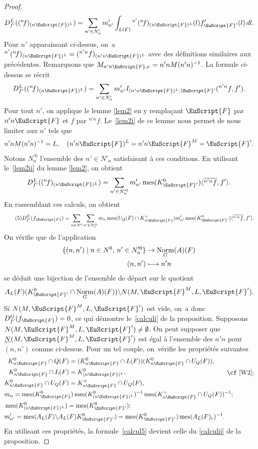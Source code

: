 \documentclass[JEP,XML,SOM,Unicode,francais]{cedram}
\let\mathcal \EuScript
\let\<\langle
\let\>\rangle
\let\sep\mid
\newcommand\mto{\mathchoice{\longmapsto}{\mapsto}{\mapsto}{\mapsto}}
\newcommand{\nf}{{}^n\!f}
\newcommand{\rc}{\mathrm{c}}
\DeclareMathOperator{\mes}{mes}
\DeclareMathOperator{\Norm}{Norm}
\newcommand{\cF}{\mathcal{F}}
\theoremstyle{plain}
\theoremstyle{definition}
\begin{document}
\begin{proof}
\[
D_{f'}^L((\nf)_{(n\cF)^L})=\sum_{n'\in N'_{n}}m'_{n'}\int_{L(F)}{^{n'}(\nf)_{(n\cF)^L}}(l)f'_{\cF'}(l)\,dl.
\]
Pour $n'$ apparaissant ci-dessus, on~a $^{n'}(\nf)_{(n\cF)^L}=(^{n'n}f)_{(n'n\cF)^L}$ avec des définitions similaires aux précédentes. Remarquons que $M_{n'n\cF,\nu}=n'nM(n'n)^{-1}$. La formule ci-dessus se récrit
\[
D_{f'}^L((\nf)_{(n\cF)^L})=\sum_{n'\in N'_{n}}m'_{n'}I_{(n'n\cF)^L,\cF'}(^{n'n}f,f').
\]
Pour tout $n'$, on applique le lemme \ref{lem2} en y remplaçant $\cF$ par $n'n\cF$ et $f$ par $^{n'n}f$. Le~\eqref{lem2i} de ce lemme nous permet de nous limiter aux $n'$ tels que
\[
n'nM(n'n)^{-1}=L,\quad (n'n\cF)^L=n'n\cF^M=\cF'.
\]
Notons $N_{n}^{\prime0}$ l'ensemble des $n'\in N'_{n}$ satisfaisant à ces conditions. En utilisant le~\eqref{lem2ii} du lemme \ref{lem2}, on obtient
\[
D_{f'}^L((\nf)_{(n\cF)^L})=\sum_{n'\in N^{\prime0}_{n}}m'_{n'}\mes(K_{\cF'}^0)\<\overline{^{n'n}f},f'\>.
\]
En rassemblant ces calculs, on obtient
\begin{equation}\tag{5}\label{calcul5}
D^G_{f'}(f_{\cF})= \sum_{n\in N^0}\sum_{n'\in N_{n}^{\prime0}}m_{n}\mes(U_{Q}(F)\cap K_{n\cF}^+) m'_{n'}\mes(K_{\cF'}^0)\<\overline{^{n'n}f},f'\>.
\end{equation}
On vérifie que de l'application
\begin{align*}
\{(n,n')\sep n\in N^0,\, n'\in N_{n}^{\prime0}\}&\to \Norm_{G}(A)(F)\\ (n,n')&\mto n'n
\end{align*}
se déduit une bijection de l'ensemble de départ sur le quotient
\[
A_{L}(F)(K_{\cF'}^0\cap \Norm_{G}(A)(F))\backslash N(M,\cF^{M},L,\cF') .
\]
Si $N(M,\cF^{M},L,\cF')$ est vide, on~a donc $D^G_{f'}(f_{\cF})=0$, ce qui démontre le~\eqref{calculi} de la proposition. Supposons $N(M,\cF^M,L,\cF')\neq\emptyset$. On peut supposer que $\underline{N}(M,\cF^M,L,\cF')$ est égal à l'ensemble des $n'n$ pour $(n,n')$ comme ci-dessus.
Pour un tel couple, on~vérifie les propriétés suivantes
\begin{align*}
&
\begin{aligned}
K_{n\cF}^0\cap Q(F)&=(K_{n\cF}^0\cap L(F))(K_{n\cF}^0\cap U_{Q}(F)),\\
K_{n\cF}^0\cap L(F)&=K_{(n\cF)^L}^0,\\
K_{n\cF}^0\cap U_{Q}(F)&=K_{n\cF}^+\cap U_{Q}(F),
\end{aligned}
\qquad\text{\cf \cite[Lem.\,6]{W2};}
\\
&m_{n}=\mes(K_{\cF}^0)\mes(K_{(n\cF)^L}^0)^{-1}\mes(K_{n\cF}^+\cap U_{Q}(F))^{-1};
\\
&\mes(K_{(n\cF)^L}^0)=\mes(K_{\cF'}^0);
\\
&m'_{n'}=\mes(A_{L}(F)\backslash A_{L}(F)K_{\cF'}^0)=\mes(K_{\cF'}^0)\mes(A_{L}(F)_{\rc})^{-1}.
\end{align*}
En utilisant ces propriétés, la formule~\eqref{calcul5} devient celle du \eqref{calculii} de la proposition.
\end{proof}
\end{document}
